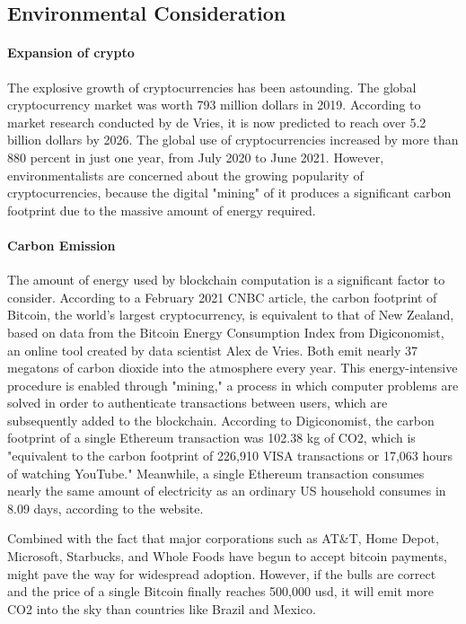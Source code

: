 \documentclass[10pt,twocolumn]{article}
\begin{document}
\subsection{Environmental Consideration}
\paragraph{Expansion of crypto}

The explosive growth of cryptocurrencies has been astounding. The global cryptocurrency market was worth 793 million dollars in 2019. According to market research conducted by de Vries, it is now predicted to reach over 5.2 billion dollars by 2026. The global use of cryptocurrencies increased by more than 880 percent in just one year, from July 2020 to June 2021. However, environmentalists are concerned about the growing popularity of cryptocurrencies, because the digital "mining" of it produces a significant carbon footprint due to the massive amount of energy required.

\paragraph{Carbon Emission}

The amount of energy used by blockchain computation is a significant factor to consider. According to a February 2021 CNBC article, the carbon footprint of Bitcoin, the world's largest cryptocurrency, is equivalent to that of New Zealand, based on data from the Bitcoin Energy Consumption Index from Digiconomist, an online tool created by data scientist Alex de Vries. Both emit nearly 37 megatons of carbon dioxide into the atmosphere every year.\cite{DownToEarth} This energy-intensive procedure is enabled through "mining," a process in which computer problems are solved in order to authenticate transactions between users, which are subsequently added to the blockchain.\cite{deVries}
According to Digiconomist, the carbon footprint of a single Ethereum transaction was 102.38 kg of CO2, which is "equivalent to the carbon footprint of 226,910 VISA transactions or 17,063 hours of watching YouTube." Meanwhile, a single Ethereum transaction consumes nearly the same amount of electricity as an ordinary US household consumes in 8.09 days, according to the website.\cite{Digiconomist2022}

Combined with the fact that major corporations such as AT&T, Home Depot, Microsoft, Starbucks, and Whole Foods have begun to accept bitcoin payments, might pave the way for widespread adoption. However, if the bulls are correct and the price of a single Bitcoin finally reaches 500,000 usd, it will emit more CO2 into the sky than countries like Brazil and Mexico.\cite{Tully}
\end{document}
